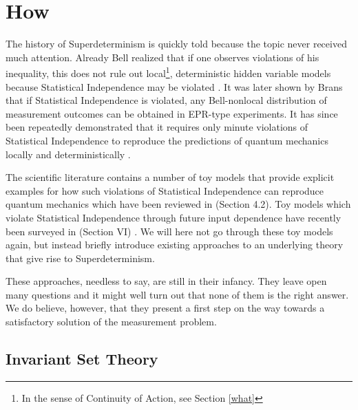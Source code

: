 \documentclass[12pt]{article}
\begin{document}
\section{How}

The history of Superdeterminism is quickly told because the topic never received much attention. Already Bell realized that if one observes violations of his inequality, this does not rule out local\footnote{In the sense of Continuity of Action, see Section \ref{what}}, deterministic hidden variable models because Statistical Independence may be violated \cite{Bell:1987hh}. It was later shown by Brans that if Statistical Independence is violated, any Bell-nonlocal distribution of measurement outcomes can be obtained in EPR-type experiments\cite{brans}. It has since been repeatedly demonstrated that it requires only minute violations of Statistical Independence to reproduce the predictions of quantum mechanics locally and deterministically \cite{Gisin,Hall2,Friedman:2018byq}. 

The scientific literature contains a number of toy models that provide explicit examples for how such violations of Statistical Independence can reproduce quantum mechanics \cite{brans,degorre,Hall3} which have been reviewed in \cite{Hall} (Section 4.2). Toy models which violate Statistical Independence through future input dependence \cite{retro1,retro2,retro3,Wharton2} have recently been surveyed in \cite{Wharton} (Section VI) . We will here not go through these toy models again, but instead briefly introduce  existing approaches to an underlying theory that give rise to Superdeterminism. 

These approaches, needless to say, are still in their infancy. They leave open many questions and it might well turn out that none of them is the right answer. We do believe, however, that they present a first step on the way towards a satisfactory solution of the measurement problem. 

\subsection{Invariant Set Theory}
\label{IST}
\end{document}
